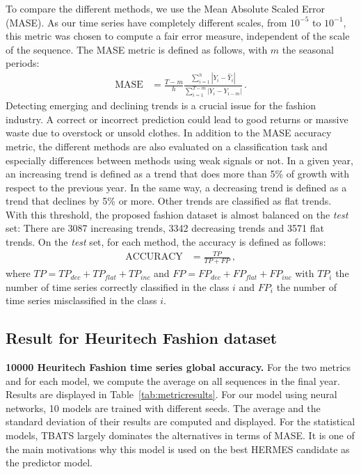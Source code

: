 \documentclass[lettersize,journal]{IEEEtran}
\begin{document}
To compare the different methods, we use the Mean Absolute Scaled Error (MASE). As our time series have completely different scales, from $10^{-5}$ to $10^{-1}$, this metric was chosen to compute a fair error measure, independent of the scale of the sequence. The MASE metric is defined as follows, with $m$ the seasonal periods:
\begin{align*}
\mathrm{MASE} &= \frac{T-m}{h}\frac{\sum_{i=1}^h |Y_i - \hat{Y}_i| }{\sum_{i=1}^{T-m} |Y_i - Y_{i-m}|}\,.
\end{align*}
Detecting emerging and declining trends is a crucial issue for the fashion industry. A correct or incorrect prediction could lead to good returns or massive waste due to overstock or unsold clothes. In addition to the MASE accuracy metric, the different methods are also evaluated on a classification task and especially differences between methods using weak signals or not. In a given year, an increasing trend is defined as a trend that does more than 5\% of growth with respect to the previous year. In the same way, a decreasing trend is defined as a trend that declines by 5\% or more. Other trends are classified as flat trends. With this threshold, the proposed fashion dataset is almost balanced on the {\em test} set: There are 3087 increasing trends, 3342 decreasing trends and 3571 flat trends. On the {\em test} set, for each method, the accuracy is defined as follows:
\begin{align*}
\mathrm{ACCURACY} &= \frac{TP}{TP + FP}\,,
\end{align*}
where $TP = TP_{dec} + TP_{flat} + TP_{inc}$ and $FP = FP_{dec} + FP_{flat} + FP_{inc}$ with $TP_i$  the number of time series correctly classified in the class $i$ and $FP_i$ the number of time series misclassified in the class $i$.


\subsection{Result for Heuritech Fashion dataset}

\textbf{10000 Heuritech Fashion time series global accuracy. }For the two metrics and for each model, we compute the average on all sequences in the final year. Results are displayed in Table~\ref{tab:metricresults}. For our model using neural networks, 10 models are trained  with different seeds. The average and the standard deviation of their results are computed and displayed. For the statistical models, TBATS largely dominates the alternatives  in terms of MASE. It is one of the main motivations why this model is used on the best HERMES candidate as the predictor model. 
\end{document}
